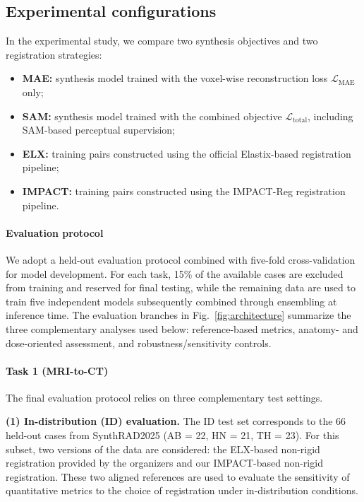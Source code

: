 \documentclass[lettersize,journal]{IEEEtran}
\begin{document}
\subsection{Experimental configurations}
In the experimental study, we compare two synthesis objectives and two registration strategies:
\begin{itemize}
\item \textbf{MAE:} synthesis model trained with the voxel-wise reconstruction loss $\mathcal{L}_{\text{MAE}}$ only;
\item \textbf{SAM:} synthesis model trained with the combined objective $\mathcal{L}_{\text{total}}$, including SAM-based perceptual supervision;
\item \textbf{ELX:} training pairs constructed using the official Elastix-based registration pipeline;
\item \textbf{IMPACT:} training pairs constructed using the IMPACT-Reg registration pipeline.
\end{itemize}

\paragraph{Evaluation protocol}

We adopt a held-out evaluation protocol combined with five-fold cross-validation for model development. For each task, 15\% of the available cases are excluded from training and reserved for final testing, while the remaining data are used to train five independent models subsequently combined through ensembling at inference time. The evaluation branches in Fig.~\ref{fig:architecture} summarize the three complementary analyses used below: reference-based metrics, anatomy- and dose-oriented assessment, and robustness/sensitivity controls.

\paragraph{Task 1 (MRI-to-CT)}

The final evaluation protocol relies on three complementary test settings.

\textbf{(1) In-distribution (ID) evaluation.} 
The ID test set corresponds to the 66 held-out cases from SynthRAD2025 (AB = 22, HN = 21, TH = 23). 
For this subset, two versions of the data are considered: the ELX-based non-rigid registration provided by the organizers and our IMPACT-based non-rigid registration. These two aligned references are used to evaluate the sensitivity of quantitative metrics to the choice of registration under in-distribution conditions.
\end{document}
